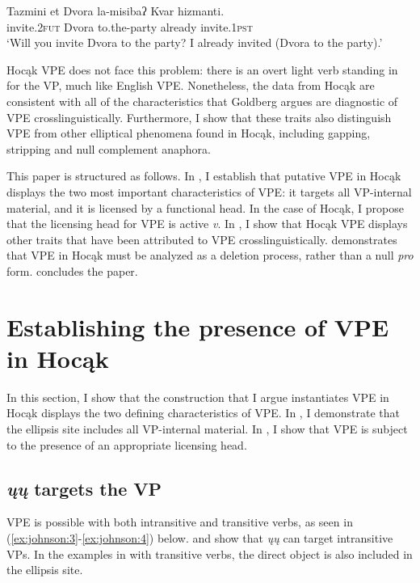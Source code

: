 \documentclass[output=paper]{LSP/langsci}
\begin{document}
\ea\label{ex:johnson:2}
\gll Tazmini {et Dvora} la-misibaʔ Kvar hizmanti.\\
invite.\textsc{2fut} Dvora to.the-party already invite.\textsc{1pst}\\
\trans `Will you invite Dvora to the party? I already invited (Dvora to the party).' \\\citep[14]{Goldberg2005}
\z

Hocąk VPE does not face this problem: there is an overt light verb standing in for the VP, much like English VPE. Nonetheless, the data from Hocąk are consistent with all of the characteristics that Goldberg argues are diagnostic of VPE crosslinguistically. Furthermore, I show that these traits also distinguish VPE from other elliptical phenomena found in Hocąk, including gapping, stripping and null complement anaphora. 

This paper is structured as follows. In , I establish that putative VPE in Hocąk displays the two most important characteristics of VPE: it targets all VP-internal material, and it is licensed by a functional head. In the case of Hocąk, I propose that the licensing head for VPE is active \emph{v}. In , I show that Hocąk VPE displays other traits that have been attributed to VPE crosslinguistically.  demonstrates that VPE in Hocąk must be analyzed as a deletion process, rather than a null \emph{pro} form.  concludes the paper.

\section{Establishing the presence of VPE in Hocąk}\label{sec:johnson:2}

In this section, I show that the construction that I argue instantiates VPE in Hocąk displays the two defining characteristics of VPE. In , I demonstrate that the ellipsis site includes all VP-internal material. In , I show that VPE is subject to the presence of an appropriate licensing head.

\subsection{\emph{ųų} targets the VP}\label{sec:johnson:2.1}

VPE is possible with both intransitive and transitive verbs, as seen in (\ref{ex:johnson:3}-\ref{ex:johnson:4}) below.  and  show that \emph{ųų} can target intransitive VPs. In the examples in  with transitive verbs, the direct object is also included in the ellipsis site.
\end{document}
